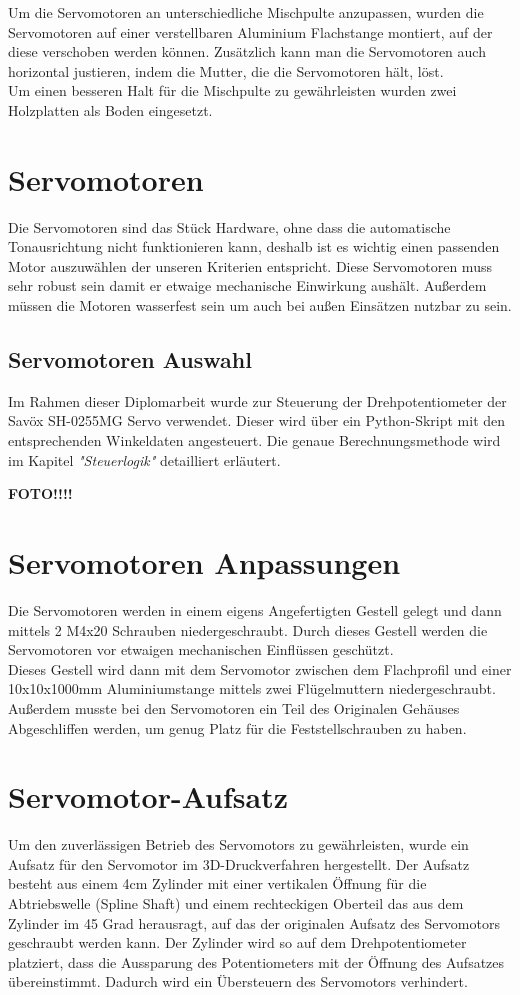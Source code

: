 Um die Servomotoren an unterschiedliche Mischpulte anzupassen, wurden die Servomotoren auf einer verstellbaren Aluminium Flachstange montiert, auf der diese verschoben werden können. Zusätzlich kann man die Servomotoren auch horizontal justieren, indem die Mutter, die die Servomotoren hält, löst. \\
Um einen besseren Halt für die Mischpulte zu gewährleisten wurden zwei Holzplatten als Boden eingesetzt.


\section{Servomotoren}
Die Servomotoren sind das Stück Hardware, ohne dass die automatische Tonausrichtung nicht funktionieren kann, deshalb ist es wichtig einen passenden Motor auszuwählen der unseren Kriterien entspricht. Diese Servomotoren muss sehr robust sein damit er etwaige mechanische Einwirkung aushält. Außerdem müssen die Motoren wasserfest sein um auch bei außen Einsätzen nutzbar zu sein. 

\subsection{Servomotoren Auswahl}

Im Rahmen dieser Diplomarbeit wurde zur Steuerung der Drehpotentiometer der Savöx SH-0255MG Servo verwendet. Dieser wird über ein Python-Skript mit den entsprechenden Winkeldaten angesteuert. Die genaue Berechnungsmethode wird im Kapitel \textit{"Steuerlogik"} detailliert erläutert.


\textbf{FOTO!!!!}


\section{Servomotoren Anpassungen}
Die Servomotoren werden in einem eigens Angefertigten Gestell gelegt und dann mittels 2 M4x20 Schrauben niedergeschraubt. Durch dieses Gestell werden die Servomotoren vor etwaigen mechanischen Einflüssen geschützt. \\
Dieses Gestell wird dann mit dem Servomotor zwischen dem Flachprofil und einer 10x10x1000mm Aluminiumstange mittels zwei Flügelmuttern niedergeschraubt.\\
Außerdem musste bei den Servomotoren ein Teil des Originalen Gehäuses Abgeschliffen werden, um genug Platz für die Feststellschrauben zu haben.


\section{Servomotor-Aufsatz}
Um den zuverlässigen Betrieb des Servomotors zu gewährleisten, wurde ein Aufsatz für den Servomotor im 3D-Druckverfahren hergestellt. Der Aufsatz besteht aus einem 4cm Zylinder mit einer vertikalen Öffnung für die  Abtriebswelle (Spline Shaft)  und einem rechteckigen Oberteil das aus dem Zylinder im 45 Grad herausragt, auf das der originalen Aufsatz des Servomotors geschraubt werden kann. Der Zylinder wird so auf dem Drehpotentiometer platziert, dass die Aussparung des Potentiometers mit der Öffnung des Aufsatzes übereinstimmt. Dadurch wird ein Übersteuern des Servomotors verhindert.



